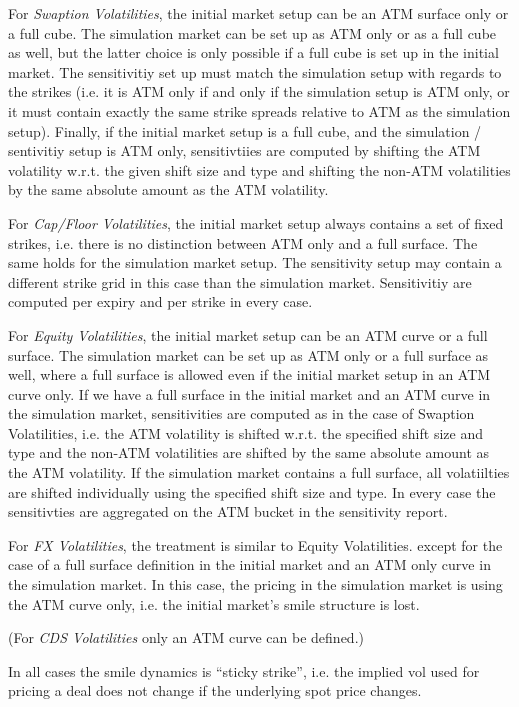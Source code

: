 \documentclass[12pt, a4paper]{article}
\begin{document}
\begin{appendix}
For {\em Swaption Volatilities}, the initial market setup can be an ATM surface only or a full cube. The simulation
market can be set up as ATM only or as a full cube as well, but the latter choice is only possible if a full cube is set
up in the initial market. The sensitivitiy set up must match the simulation setup with regards to the strikes (i.e. it
is ATM only if and only if the simulation setup is ATM only, or it must contain exactly the same strike spreads relative
to ATM as the simulation setup). Finally, if the initial market setup is a full cube, and the simulation / sentivitiy
setup is ATM only, sensitivtiies are computed by shifting the ATM volatility w.r.t. the given shift size and type and
shifting the non-ATM volatilities by the same absolute amount as the ATM volatility.

For {\em Cap/Floor Volatilities}, the initial market setup always contains a set of fixed strikes, i.e. there is no
distinction between ATM only and a full surface. The same holds for the simulation market setup. The sensitivity setup
may contain a different strike grid in this case than the simulation market. Sensitivitiy are computed per expiry and
per strike in every case.

For {\em Equity Volatilities}, the initial market setup can be an ATM curve or a full surface. The simulation market can
be set up as ATM only or a full surface as well, where a full surface is allowed even if the initial market setup in an
ATM curve only. If we have a full surface in the initial market and an ATM curve in the simulation market, sensitivities
are computed as in the case of Swaption Volatilities, i.e. the ATM volatility is shifted w.r.t. the specified shift size
and type and the non-ATM volatilities are shifted by the same absolute amount as the ATM volatility. If the simulation
market contains a full surface, all volatiilties are shifted individually using the specified shift size and type. In
every case the sensitivties are aggregated on the ATM bucket in the sensitivity report.

For {\em FX Volatilities}, the treatment is similar to Equity Volatilities. except for the case of a full surface
definition in the initial market and an ATM only curve in the simulation market. In this case, the pricing in the
simulation market is using the ATM curve only, i.e. the initial market's smile structure is lost.

(For {\em CDS Volatilities} only an ATM curve can be defined.)

In all cases the smile dynamics is ``sticky strike'', i.e. the implied vol used for pricing a deal does not change if
the underlying spot price changes.

\end{appendix}
\end{document}
